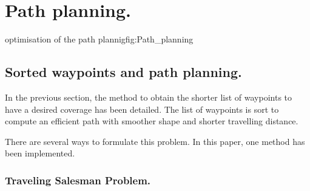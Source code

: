 	
	\section{ Path planning. }\label{PathPlanning}
 \begin{mfigures}[!]{optimisation of the path plannig}{fig:Path_planning} \centering
{}
\hspace{1cm}
\end{mfigures} 
 
  \subsection{Sorted waypoints and path planning.} \label{sorted}
In the previous section, the method to obtain the shorter list of waypoints to have a desired coverage has been detailed. The list of waypoints is sort to compute an efficient path with smoother shape and shorter travelling distance. 

There are several ways to formulate this problem. In this paper, one method has been implemented.
 
\subsubsection*{Traveling Salesman Problem. }\label{sec:TSP}



